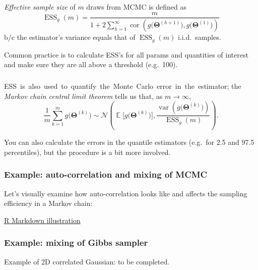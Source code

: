 \documentclass[18pt]{beamer}
\newcommand{\titleSmallCap}[1]{{\fontsize{12}{14}\selectfont  \MakeUppercase{#1}}}
\newcommand{\smallCap}[1]{{\small \MakeUppercase{#1}}}
\DeclareMathOperator{\expectation}{\mathbb{E}}
\newcommand{\normalDist}{\mathcal{N}}
\newcommand{\randVar}{\Theta}
\newcommand{\brandVar}{\bm{\randVar}}
\newcommand{\mcmc}{{\small MCMC}}
\newcommand{\mcIndex}{k}
\newcommand{\mcSampleSize}{m}
\newcommand{\lag}{h}
\begin{document}
\begin{frame}
\frametitle{\frametitleText}
\textit{Effective sample size} of $\mcSampleSize$ draws from \mcmc{} is defined as
\begin{equation*}
\operatorname{ESS}_g (\mcSampleSize) =
\frac{\mcSampleSize}{
	1 + 2 \sum_{\lag = 1}^\infty \operatorname{cor} \!\left( g\bigl( \brandVar^{(\lag + 1)} \bigr), g\bigl( \brandVar^{(1)} \bigr)  \right)
}
\end{equation*}
b/c the estimator's variance equals that of $\operatorname{ESS}_g (\mcSampleSize)$ i.i.d.\ samples.

\pause
\medskip
Common practice is to calculate \smallCap{ess}'s for all params and quantities of interest and make sure they are all above a threshold (e.g.\ 100).
\end{frame}


\begin{frame}
\frametitle{\frametitleText}
\mbox{E\smallCap{ss} is also used to quantify the Monte Carlo error in the estimator;}
the \textit{Markov chain central limit theorem} tells us that, as $\mcSampleSize \to \infty$, 
\begin{equation*}
\frac{1}{\mcSampleSize} \sum_{\mcIndex = 1}^\mcSampleSize g\bigl( \brandVar^{(\mcIndex)} \bigr)
	\sim \normalDist\left(
		\expectation \bigl[
			g\bigl( \brandVar^{(\mcIndex)} \bigr)
		\bigr],
		\frac{
			\operatorname{var}\!\left( g\bigl( \brandVar^{(\mcIndex)} \bigr) \right)
		}{
			\operatorname{ESS}_g (\mcSampleSize)
		}
	\right).
\end{equation*}

\pause
You can also calculate the errors in the quantile estimators (e.g.\ for 2.5 and 97.5 percentiles), but the procedure is a bit more involved.
\end{frame}


\renewcommand{\frametitleText}{Example: auto-correlation and mixing of \titleSmallCap{MCMC}}
\begin{frame}
\frametitle{\frametitleText}

Let's visually examine how auto-correlation looks like and affects the sampling efficiency in a Markov chain:

\smallskip
{\centering
	\href{https://rpubs.com/aki-nishimura/1382691}{%
		\textcolor{linkColor}{R Markdown illustration}%
	}
	\par
}

\end{frame}


\renewcommand{\frametitleText}{Example: mixing of Gibbs sampler}
\begin{frame}
\frametitle{\frametitleText}

Example of 2D correlated Gaussian: to be completed.

\end{frame}
\end{document}
